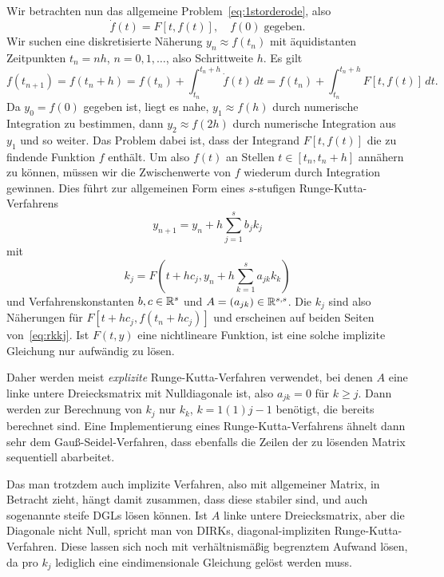 \subsection{}

Wir betrachten nun das allgemeine Problem~\eqref{eq:1storderode}, also
\begin{equation*}
  \dot f(t) = F[t, f(t)],\quad f(0)\;\text{gegeben}.
\end{equation*}
Wir suchen eine diskretisierte Näherung $y_n \approx f(t_n)$ mit
äquidistanten Zeitpunkten $t_n=n h$, $n=0,1,\ldots$, also Schrittweite
$h$. Es gilt
\begin{equation}
  f(t_{n+1}) = f(t_n+h) = f(t_n) + \int_{t_n}^{t_n+h} \dot f(t)\,dt
  =  f(t_n) + \int_{t_n}^{t_n+h} F[t, f(t)]\,dt.
\end{equation}
Da $y_0 = f(0)$ gegeben ist, liegt es nahe, $y_1 \approx f(h)$ durch
numerische Integration zu bestimmen, dann $y_2 \approx f(2h)$ durch
numerische Integration aus $y_1$ und so weiter. Das Problem dabei ist,
dass der Integrand $F[t, f(t)]$ die zu findende Funktion $f$
enthält. Um also $f(t)$ an Stellen $t\in [t_n, t_n + h]$ annähern zu
können, müssen wir die Zwischenwerte von $f$ wiederum durch
Integration gewinnen. Dies führt zur allgemeinen Form eines
$s$-stufigen Runge-Kutta-Verfahrens
\begin{equation}
  y_{n+1} = y_n + h\sum_{j=1}^s b_j k_j
\end{equation}
mit
\begin{equation}
  \label{eq:rkkj}
  k_j = F(t + h c_j, y_n + h \sum_{k=1}^s a_{jk} k_k)
\end{equation}
und Verfahrenskonstanten $b,c\in\mathbb{R}^s$ und
$A=(a_{jk})\in\mathbb{R}^{s,s}$. Die $k_j$ sind also Näherungen für $F[t + h
c_j, f(t_n + h c_j)]$ und erscheinen auf beiden Seiten
von~\eqref{eq:rkkj}. Ist $F(t,y)$ eine nichtlineare Funktion, ist eine
solche implizite Gleichung nur aufwändig zu lösen.

%
Daher werden meist \emph{explizite} Runge-Kutta-Verfahren verwendet,
bei denen $A$ eine linke untere Dreiecksmatrix mit Nulldiagonale ist,
also $a_{jk} = 0$ für $k\ge j$. Dann werden zur Berechnung von $k_j$
nur $k_k$, $k=1(1)j-1$ benötigt, die bereits berechnet sind. Eine
Implementierung eines Runge-Kutta-Verfahrens ähnelt dann sehr dem
Gauß-Seidel-Verfahren, dass ebenfalls die Zeilen der zu lösenden
Matrix sequentiell abarbeitet.

Das man trotzdem auch implizite Verfahren, also mit allgemeiner
Matrix, in Betracht zieht, hängt damit zusammen, dass diese stabiler
sind, und auch sogenannte steife DGLs lösen können. Ist $A$ linke
untere Dreiecksmatrix, aber die Diagonale nicht Null, spricht man von
DIRKs, diagonal-impliziten Runge-Kutta-Verfahren. Diese lassen sich
noch mit verhältnismäßig begrenztem Aufwand lösen, da pro $k_j$
lediglich eine eindimensionale Gleichung gelöst werden muss.

